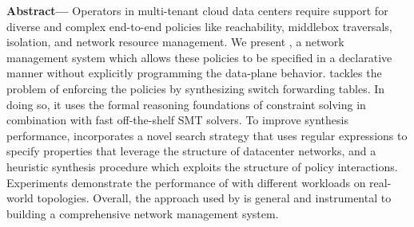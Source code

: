 
  {\bf Abstract---} Operators in multi-tenant cloud data centers require support for
  diverse and complex end-to-end policies like reachability, middlebox
  traversals, isolation, and network resource management. We present
  \Name, a network management system which allows these policies to be
  specified in a declarative manner without explicitly programming the
  data-plane behavior.  \name tackles the problem of enforcing the
  policies by synthesizing switch forwarding tables. In doing so, it
  uses the formal reasoning foundations of constraint solving in
  combination with fast off-the-shelf SMT solvers.  To improve
  synthesis performance, \Name incorporates a novel search strategy that
  uses regular expressions to specify properties that leverage the
  structure of datacenter networks,
  and a heuristic synthesis procedure which exploits the structure of
  policy interactions.  Experiments demonstrate the performance of
  \Name with different workloads on real-world topologies. Overall,
  the approach used by \Name is general and instrumental to building a
  comprehensive network management system.

